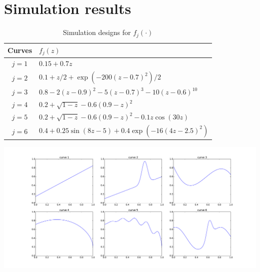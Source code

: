 \documentclass[12pt,oneside,reqno,english]{amsart}
\theoremstyle{definition}
\begin{document}

\newpage{} 
\section{Simulation results}\label{a:sim}
\begin{table}[H]
\vspace{0.5cm}
\begin{tabular}{cl}
\hline 
Curves & $f_{j}(z)$\tabularnewline
\hline 
\hline 
$j=1$  & $0.15+0.7z$\tabularnewline
$j=2$  & $0.1+z/2+\exp(-200(z-0.7)^{2})/2$\tabularnewline
$j=3$  & $0.8-2(z-0.9)^{2}-5(z-0.7)^{3}-10(z-0.6)^{10}$\tabularnewline
$j=4$  & $0.2+\sqrt{1-z}-0.6(0.9-z)^{2}$\tabularnewline
$j=5$  & $0.2+\sqrt{1-z}-0.6(0.9-z)^{2}-0.1z\cos(30z)$\tabularnewline
$j=6$  & $0.4+0.25\sin(8z-5)+0.4\exp(-16(4z-2.5)^{2})$\tabularnewline
\hline 
\end{tabular}\vspace{2cm}
\begin{center}
\includegraphics[scale=0.35]{curves}
\end{center}
\vspace{0.5cm}
\caption{Simulation designs for $f_{j}(\cdot)$}\label{t:curves}
\end{table}


\newpage{}
\end{document}
